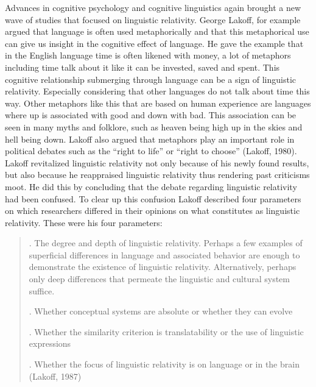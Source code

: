  
	Advances in cognitive psychology and cognitive linguistics again brought a new wave of studies that focused on linguistic relativity. George Lakoff, for example argued that language is often used metaphorically and that this metaphorical use can give us insight in the cognitive effect of language. He gave the example that in the English language time is often likened with money, a lot of metaphors including time talk about it like it can be invested, saved and spent. This cognitive relationship submerging through language can be a sign of linguistic relativity. Especially considering that other languages do not talk about time this way. Other metaphors like this that are based on human experience are languages where up is associated with good and down with bad. This association can be seen in many myths and folklore, such as heaven being high up in the skies and hell being down. Lakoff also argued that metaphors play an important role in political debates such as the “right to life” or “right to choose” (Lakoff, 1980). Lakoff revitalized linguistic relativity not only because of his newly found  results, but also because he reappraised linguistic relativity thus rendering past criticisms moot. He did this by concluding that the debate regarding linguistic relativity had been confused. To clear up this confusion Lakoff described four parameters on which researchers differed in their opinions on what constitutes as linguistic relativity. These were his four parameters: 

\begin{quote}
\begin{singlespace}

. The degree and depth of linguistic relativity. Perhaps a few examples of superficial differences in language and associated behavior are enough to demonstrate the existence of linguistic relativity. Alternatively, perhaps only deep differences that permeate the linguistic and cultural system suffice. 

    . Whether conceptual systems are absolute or whether they can evolve 

    . Whether the similarity criterion is translatability or the use of linguistic expressions 

    . Whether the focus of linguistic relativity is on language or in the brain (Lakoff, 1987)

\end{singlespace}
\end{quote}

